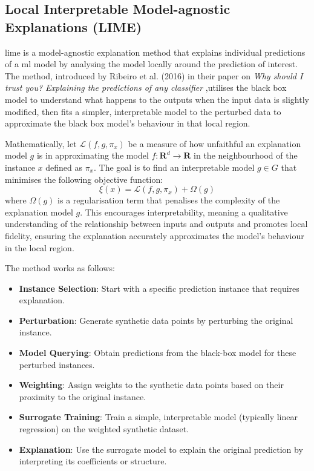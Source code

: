 \subsection{Local Interpretable Model-agnostic Explanations (LIME)} \label{sec:lime}

\acrfull{lime} is a model-agnostic explanation method that explains individual predictions of a \acrlong{ml} model by analysing the model locally around the prediction of interest. The method, introduced by Ribeiro et al. (2016) in their paper on \textit{Why should I trust you? Explaining the predictions of any classifier} \cite{Ribeiro2016},utilises the black box model to understand what happens to the outputs when the input data is slightly modified, then fits a simpler, interpretable model to the perturbed data to approximate the black box model's behaviour in that local region.

Mathematically, let $\mathcal{L}(f,g,\pi_x)$ be a measure of how unfaithful an explanation model $g$ is in approximating the model $f:\mathbf{R}^d \to \mathbf{R}$ in the neighbourhood of the instance $x$ defined as $\pi_x$. The goal is to find an interpretable model $g \in G$ that minimises the following objective function:
\begin{equation}
    \xi(x) = \mathcal{L}(f, g, \pi_x) + \Omega(g)
\end{equation}
where $\Omega(g)$ is a regularisation term that penalises the complexity of the explanation model $g$. This encourages interpretability, meaning a qualitative understanding of the relationship between inputs and outputs and promotes local fidelity, ensuring the explanation accurately approximates the model's behaviour in the local region. 

The method works as follows:
\begin{itemize}
    \item \textbf{Instance Selection}: Start with a specific prediction instance that requires explanation.
    \item \textbf{Perturbation}: Generate synthetic data points by perturbing the original instance.
    \item \textbf{Model Querying}: Obtain predictions from the black-box model for these perturbed instances.
    \item \textbf{Weighting}: Assign weights to the synthetic data points based on their proximity to the original instance.
    \item \textbf{Surrogate Training}: Train a simple, interpretable model (typically linear regression) on the weighted synthetic dataset.
    \item \textbf{Explanation}: Use the surrogate model to explain the original prediction by interpreting its coefficients or structure.
\end{itemize}

